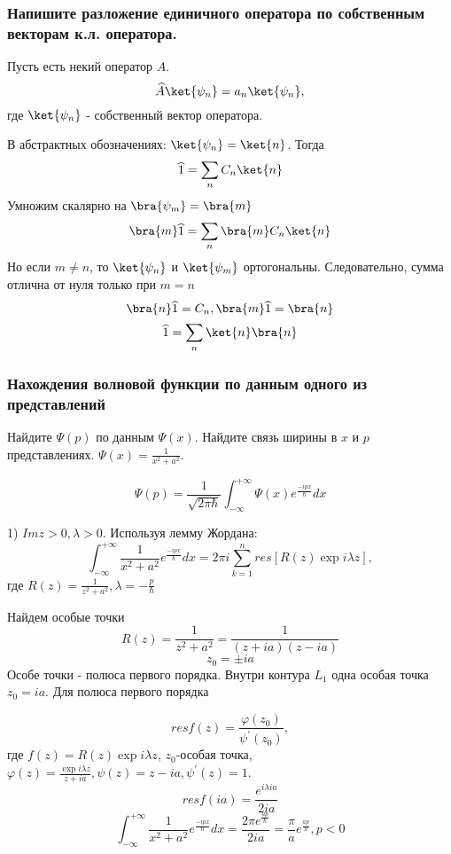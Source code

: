 \subsubsection{Напишите разложение единичного оператора по собственным векторам к.л. оператора.}


Пусть есть некий оператор $\widehat{A}$.
$$\widehat{A}\ket{\psi_n} = a_n \ket{\psi_n},$$
где $\ket{\psi_n}$ - собственный вектор оператора.

В абстрактных обозначениях: $\ket{\psi_n} = \ket{n}$. Тогда
$$\widehat{1}=\sum_n C_n \ket{n}$$
Умножим скалярно на $\bra{\psi_m} = \bra{m}$
$$\bra{m} \widehat{1}=\sum_n \bra{m} C_n \ket{n}$$
Но если $m\neq n$, то $\ket{\psi_n}$ и $\ket{\psi_m}$ ортогональны. Следовательно, сумма отлична от нуля только при $m=n$ 
$$\bra{n} \widehat{1}=C_n, \bra{m}\widehat{1}=\bra{n}$$
$$\widehat{1}=\sum_n \ket{n} \bra{n}$$

\subsubsection{Нахождения волновой функции по данным одного из представлений}

Найдите $\Psi(p)$ по данным $\Psi(x)$. Найдите связь ширины в $x$ и $p$ представлениях. $\Psi(x)=\frac{1}{x^2+a^2}$.


$$\Psi(p)=\frac{1}{\sqrt{2\pi \hbar}} \int_{-\infty}^{+\infty} \Psi(x) e^{\frac{-ipx}{\hbar}}dx$$

1) $Im z>0, \lambda >0$. Используя лемму Жордана:
$$\int_{-\infty}^{+\infty} \frac{1}{x^2+a^2} e^{\frac{-ipx}{\hbar}}dx=2\pi i \sum_{k=1}^n res [R(z)\exp{i \lambda z}],$$
где $R(z)=\frac{1}{z^2+a^2}, \lambda=-\frac{p}{\hbar}$ 

Найдем особые точки 
$$R(z)= \frac{1}{z^2+a^2} = \frac{1}{(z+ia)(z-ia)}$$
$$z_0=\pm ia$$
Особе точки - полюса первого порядка. Внутри контура $L_1$ одна особая точка $z_0=ia$. Для полюса первого порядка


$$res f(z) = \frac{\varphi(z_0)}{\psi^{'}(z_0)},$$
где $f(z)=R(z)\exp{i \lambda z}$, $z_0$-особая точка, $\varphi(z)=\frac{\exp{i \lambda z}}{z+ia}, \psi(z)=z-ia, \psi^{'}(z)=1$.
$$res f(ia) = \frac{e^{i \lambda i a}}{2ia}$$
$$\int_{-\infty}^{+\infty} \frac{1}{x^2+a^2} e^{\frac{-ipx}{\hbar}}dx=\frac{2\pi e^{\frac{ap}{\hbar}}}{2ia}=\frac{\pi}{a} e^{\frac{ap}{\hbar}}, p<0$$

